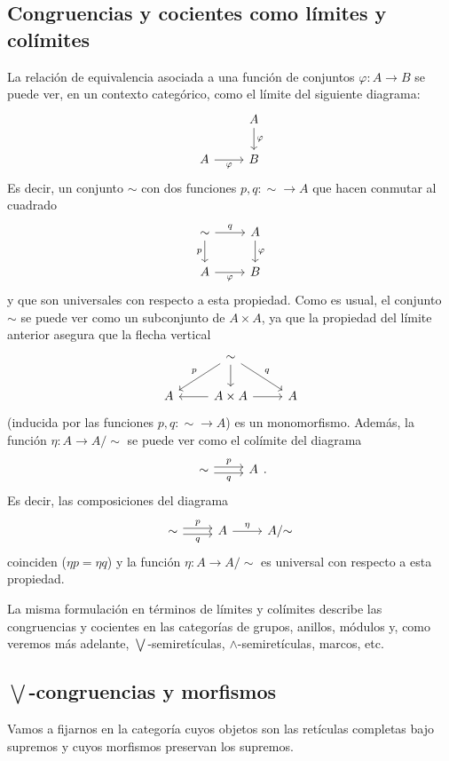 \documentclass[12pt,letterpaper,titlepage]{article}
\theoremstyle{definition}
\newcommand\Sup{\bigvee}
\renewcommand\inf{\wedge}
\renewcommand\phi{\varphi}
\newcommand\simr{{\sim}}
\newcommand\tps[1]{\texorpdfstring{#1}{}}
\newcommand\<{\langle}
\renewcommand\>{\rangle}
\begin{document}
\subsection{Congruencias y cocientes como límites y colímites}
La relación de equivalencia asociada a una función
de conjuntos $\phi:A\to B$ se puede ver, en un contexto categórico, como
el límite del siguiente diagrama:
\[
    \begin{tikzcd}
        & A\ar[d,"\phi"] \\
        A \ar[r,"\phi"'] & B
    \end{tikzcd}
\]
Es decir, un conjunto $\sim$ con dos funciones $p,q:\simr\to A$
que hacen conmutar al cuadrado
\[
    \begin{tikzcd}
        \simr \ar[d,"p"'] \ar[r,"q"] & A\ar[d,"\phi"] \\
        A \ar[r,"\phi"'] & B
    \end{tikzcd}
\]
y que son universales con respecto a esta propiedad.
Como es usual, el conjunto $\sim$ se puede ver como un subconjunto de
$A\times A$, ya que la propiedad del límite anterior asegura que
la flecha vertical
\[
    \begin{tikzcd}
        & \sim \ar[dl,"p"'] \ar[d] \ar[dr,"q"] \\
        A & A\times A \ar[l] \ar[r] & A
    \end{tikzcd}
\]
(inducida por las funciones $p,q:\simr\to A$) es un monomorfismo.
Además, la función $\eta:A\to A/\simr$ se puede ver como el colímite
del diagrama
\[
    \begin{tikzcd}
        \sim \ar[r,"p",shift left] \ar[r,"q"',shift right] & A 
    \end{tikzcd}
.\]
Es decir, las composiciones del diagrama
\[
    \begin{tikzcd}
        \sim \ar[r,"p",shift left] \ar[r,"q"',shift right]
        & A \ar[r,"\eta"]
        &A/\simr 
    \end{tikzcd}
\]
coinciden ($\eta p = \eta q$) y la función $\eta:A\to A/\simr$ es
universal con respecto a esta propiedad.

La misma formulación en términos de límites y colímites describe
las congruencias y cocientes en las categorías de grupos, anillos,
módulos y, como veremos más adelante, $\Sup$-semiretículas,
$\inf$-semiretículas, marcos, etc.

\subsection{\tps{$\Sup$}{}-congruencias y morfismos}
Vamos a fijarnos en la categoría cuyos objetos son las retículas
completas bajo supremos y cuyos morfismos preservan los supremos.
\end{document}
